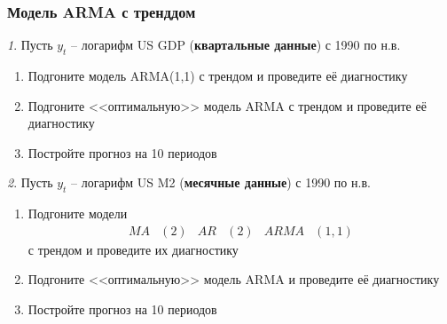 \documentclass[12pt]{article}
\theoremstyle{remark}
\newtheorem{exercise}{}[subsection]
\begin{document}
\subsubsection{Модель ARMA с тренддом}

\begin{exercise}
Пусть \(y_t\) -- логарифм US GDP (\textbf{квартальные данные}) с 1990 по н.в.
\begin{enumerate}
	\item Подгоните модель ARMA(1,1) с трендом и проведите её диагностику
	\item Подгоните <<оптимальную>> модель ARMA с трендом и проведите её диагностику
	\item Постройте прогноз на 10 периодов
\end{enumerate}
\end{exercise}

\begin{exercise}
Пусть \(y_t\) -- логарифм US M2 (\textbf{месячные данные}) с 1990 по н.в.
\begin{enumerate}
\item Подгоните модели 
	\begin{align*}
		MA&(2) & AR&(2) & ARMA&(1,1) 
	\end{align*} 
	с трендом и проведите их диагностику
	\item Подгоните <<оптимальную>> модель ARMA и проведите её диагностику
	\item Постройте прогноз на 10 периодов
\end{enumerate}
\end{exercise}


\end{document}
